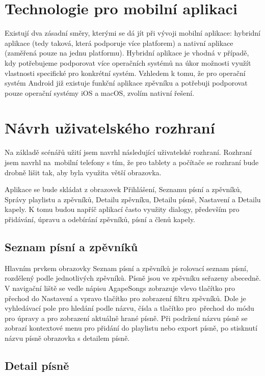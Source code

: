 \section{Technologie pro mobilní aplikaci}

Existují dva zásadní směry, kterými se dá jít při vývoji mobilní aplikace: hybridní aplikace (tedy taková, která podporuje více platforem) a nativní aplikace (zaměřená pouze na jednu platformu). Hybridní aplikace je vhodná v případě, kdy potřebujeme podporovat více operačních systémů na úkor možnosti využít vlastnosti specifické pro konkrétní systém. Vzhledem k tomu, že pro operační systém Android již existuje funkční aplikace zpěvníku a potřebuji podporovat pouze operační systémy iOS a macOS, zvolím nativní řešení.

\section{Návrh uživatelského rozhraní}

Na základě scénářů užití jsem navrhl následující uživatelské rozhraní. Rozhraní jsem navrhl na~mobilní telefony s tím, že pro tablety a počítače se rozhraní bude drobně lišit tak, aby byla využita větší obrazovka.

Aplikace se bude skládat z obrazovek Přihlášení, Seznamu písní a zpěvníků, Správy playlistu a zpěvníků, Detailu zpěvníku, Detailu písně, Nastavení a Detailu kapely. K tomu budou napříč aplikací často využity dialogy, především pro přidávání, úpravu a odebírání zpěvníků, písní a členů kapely.

\subsection{Seznam písní a zpěvníků}

Hlavním prvkem obrazovky Seznam písní a zpěvníků je rolovací seznam písní, rozdělený podle jednotlivých zpěvníků. Písně jsou ve zpěvníku seřazeny abecedně. V navigační liště se vedle nápisu AgapeSongs zobrazuje vlevo tlačítko pro přechod do Nastavení a vpravo tlačítko pro zobrazení filtru zpěvníků. Dole je vyhledávací pole pro hledání podle názvu, čísla a tlačítko pro~přechod do módu pro úpravy a pro zobrazení aktuálně hrané písně. Při podržení názvu písně se zobrazí kontextové menu pro přidání do playlistu nebo export písně, po stisknutí názvu písně obrazovka s detailem písně.

\subsection{Detail písně}

